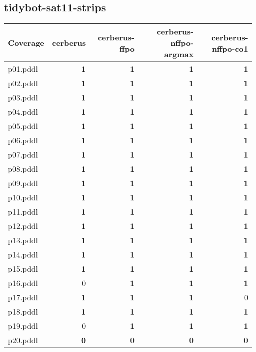 \documentclass{article}
\begin{document}
\hypertarget{coverage-tidybot-sat11-strips}{}
\subsection*{tidybot-sat11-strips}

\begin{tabular}{@{}lrrrr@{}}
Coverage & cerberus & cerberus-ffpo & cerberus-nffpo-argmax & cerberus-nffpo-co1 \\
\midrule
p01.pddl & \textbf{1} & \textbf{1} & \textbf{1} & \textbf{1} \\
p02.pddl & \textbf{1} & \textbf{1} & \textbf{1} & \textbf{1} \\
p03.pddl & \textbf{1} & \textbf{1} & \textbf{1} & \textbf{1} \\
p04.pddl & \textbf{1} & \textbf{1} & \textbf{1} & \textbf{1} \\
p05.pddl & \textbf{1} & \textbf{1} & \textbf{1} & \textbf{1} \\
p06.pddl & \textbf{1} & \textbf{1} & \textbf{1} & \textbf{1} \\
p07.pddl & \textbf{1} & \textbf{1} & \textbf{1} & \textbf{1} \\
p08.pddl & \textbf{1} & \textbf{1} & \textbf{1} & \textbf{1} \\
p09.pddl & \textbf{1} & \textbf{1} & \textbf{1} & \textbf{1} \\
p10.pddl & \textbf{1} & \textbf{1} & \textbf{1} & \textbf{1} \\
p11.pddl & \textbf{1} & \textbf{1} & \textbf{1} & \textbf{1} \\
p12.pddl & \textbf{1} & \textbf{1} & \textbf{1} & \textbf{1} \\
p13.pddl & \textbf{1} & \textbf{1} & \textbf{1} & \textbf{1} \\
p14.pddl & \textbf{1} & \textbf{1} & \textbf{1} & \textbf{1} \\
p15.pddl & \textbf{1} & \textbf{1} & \textbf{1} & \textbf{1} \\
p16.pddl & 0 & \textbf{1} & \textbf{1} & \textbf{1} \\
p17.pddl & \textbf{1} & \textbf{1} & \textbf{1} & 0 \\
p18.pddl & \textbf{1} & \textbf{1} & \textbf{1} & \textbf{1} \\
p19.pddl & 0 & \textbf{1} & \textbf{1} & \textbf{1} \\
p20.pddl & \textbf{0} & \textbf{0} & \textbf{0} & \textbf{0} \\
\end{tabular}
\end{document}
